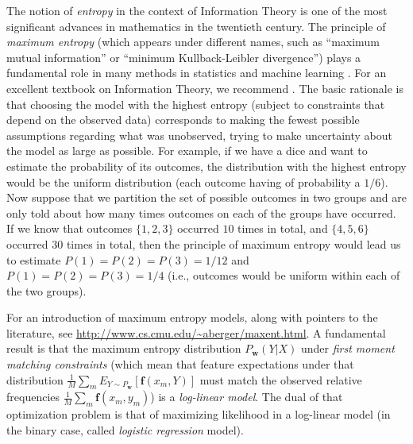 The notion of \emph{entropy} in the context of Information Theory \citep{Shannon1948} is one of the most significant advances 
in mathematics in the twentieth century. The principle of \emph{maximum entropy} (which appears under different names, 
such as ``maximum mutual information'' or  ``minimum Kullback-Leibler divergence'') plays a fundamental role 
in many methods in statistics and machine learning \citep{Jaynes1982}. 
For an excellent textbook on Information Theory, we recommend \citet{Cover1991}. 
The basic rationale is that choosing the model with the highest entropy (subject to 
constraints that depend on the observed data) corresponds to making the fewest 
possible assumptions regarding what was unobserved, trying to make uncertainty 
about the model as large as possible. For example, if we have a dice and want to estimate 
the probability of its outcomes, the distribution with the highest entropy would be the 
uniform distribution (each outcome having of probability a $1/6$). 
Now suppose that we partition the set of possible outcomes in two groups and are only told about how many 
times outcomes on each of the groups have occurred. 
If we know that outcomes $\{1,2,3\}$ occurred $10$ times in total, and 
$\{4,5,6\}$ occurred $30$ times in total, then the principle of maximum entropy would lead us to 
estimate $P(1)=P(2)=P(3)=1/12$ and $P(1)=P(2)=P(3)=1/4$ (i.e., outcomes would be uniform 
within each of the two groups). 

For an introduction of maximum entropy models, along with pointers to the literature, see 
\url{http://www.cs.cmu.edu/~aberger/maxent.html}. A fundamental result is that 
the maximum entropy distribution $P_{\boldsymbol{w}}(Y|X)$ under \emph{first moment matching constraints} (which mean that 
feature expectations under that distribution $\frac{1}{M}\sum_m E_{Y \sim P_{\boldsymbol{w}}}[\boldsymbol{f}(x_m,Y)]$ 
must match the observed relative frequencies 
 $\frac{1}{M}\sum_m \boldsymbol{f}(x_m,y_m)$) 
is a \emph{log-linear model}. The dual of that optimization problem is that of 
maximizing likelihood in a log-linear model (in the binary case, called \emph{logistic regression} model). 

